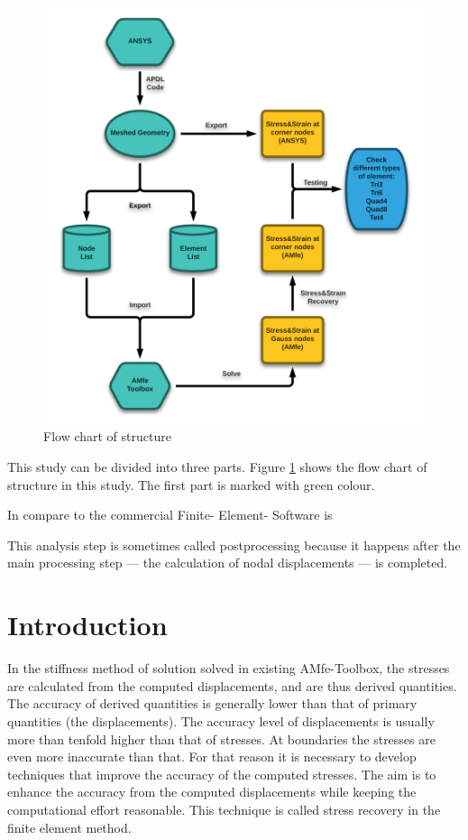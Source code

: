 \documentclass{article}
\begin{document}
 \begin{figure}
 	\begin{center}
 		\includegraphics[width=12cm,clip]{Overview.pdf}			
 		\caption{Flow chart of structure} \label{fig: Overview}
 	\end{center}
 \end{figure}



This study can be divided into three parts.  Figure \ref{fig: Overview} shows the flow chart of structure in this study. The first part is marked with green colour. 




In compare to the commercial Finite- Element- Software is 

This analysis step is sometimes called postprocessing because it happens after the main processing step — the calculation of nodal displacements — is completed. 
\section{Introduction} 
In the stiffness method of solution solved in existing AMfe-Toolbox, the stresses are calculated from the computed displacements, and are thus derived quantities. The accuracy of derived quantities is generally lower than that of primary quantities (the displacements). The accuracy level of displacements is usually more than tenfold higher than that of stresses. At boundaries the stresses are even more inaccurate than that.
For that reason it is necessary to develop techniques that improve the accuracy of the computed stresses. The aim is to enhance the accuracy from the computed displacements while keeping the computational effort reasonable. This technique is called stress recovery in the finite element method.
\end{document}
